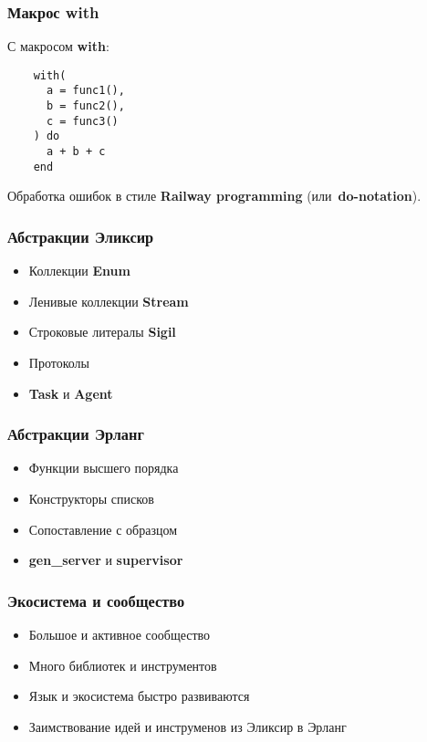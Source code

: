 \documentclass[10pt,xcolor=x11names]{beamer}
\begin{document}
\begin{frame}[fragile]
  \frametitle{Макрос with}
  С макросом \textbf{with}:
  \begin{lstlisting}
    with(
      a = func1(),
      b = func2(),
      c = func3()
    ) do
      a + b + c
    end
  \end{lstlisting}
  Обработка ошибок в стиле \textbf{Railway programming} (или~\textbf{do-notation}).
\end{frame}

\begin{frame}
  \frametitle{Абстракции Эликсир}
  \begin{itemize}
  \item Коллекции \textbf{Enum}
  \item Ленивые коллекции \textbf{Stream}
  \item Строковые литералы \textbf{Sigil}
  \item Протоколы
  \item \textbf{Task} и \textbf{Agent}
  \end{itemize}
\end{frame}

\begin{frame}
  \frametitle{Абстракции Эрланг}
  \begin{itemize}
  \item Функции высшего порядка
  \item Конструкторы списков
  \item Сопоставление с образцом
  \item \textbf{gen\_server} и \textbf{supervisor}
  \end{itemize}
\end{frame}

\begin{frame}
  \frametitle{Экосистема и сообщество}
  \begin{itemize}
  \item Большое и активное сообщество
  \item Много библиотек и инструментов
  \item Язык и экосистема быстро развиваются
  \item Заимствование идей и инструменов из Эликсир в Эрланг
  \end{itemize}
\end{frame}
\end{document}
